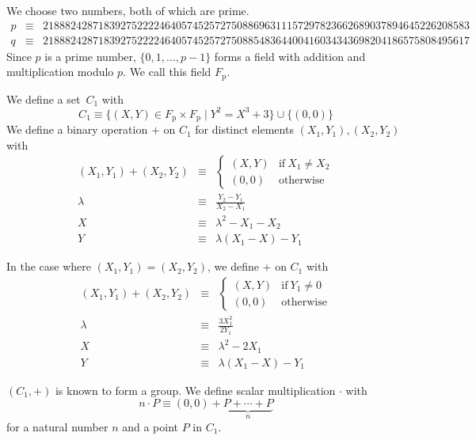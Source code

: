 \documentclass[9pt,oneside]{amsart}
\begin{document}
We choose two numbers, both of which are prime.
\begin{eqnarray}
p &\equiv& 21888242871839275222246405745257275088696311157297823662689037894645226208583 \\
q &\equiv& 21888242871839275222246405745257275088548364400416034343698204186575808495617
\end{eqnarray}
Since $p$ is a prime number, $\{0, 1, \ldots, p - 1\}$ forms a field with addition and multiplication modulo $p$. We call this field $F_{\mathrm{p}}$.

We define a set~$C_1$ with
\begin{equation}
C_1\equiv\{(X,Y)\in F_{\mathrm{p}}\times F_{\mathrm{p}}\mid Y^2=X^3+3\}\cup\{(0,0)\}
\end{equation}
We define a binary operation $+$ on $C_1$ for distinct elements $(X_1, Y_1), (X_2, Y_2)$ with
\begin{eqnarray}\label{eq:ec-addition}
(X_1, Y_1) + (X_2, Y_2)&\equiv&\begin{cases}
(X,Y)&\text{if}\ X_1\neq X_2\\
(0,0)&\text{otherwise}
\end{cases}\\
\nonumber \lambda&\equiv&\frac{Y_2-Y_1}{X_2-X_1}\\
\nonumber X&\equiv&\lambda^2-X_1-X_2\\
\nonumber Y&\equiv&\lambda(X_1-X)-Y_1
\end{eqnarray}

In the case where $(X_1, Y_1) = (X_2, Y_2)$, we define $+$ on $C_1$ with
\begin{eqnarray}\label{eq:ec-doubling}
(X_1, Y_1) + (X_2, Y_2)&\equiv&\begin{cases}
(X,Y)&\text{if}\ Y_1\neq 0\\
(0,0)&\text{otherwise}
\end{cases}\\
\nonumber \lambda&\equiv&\frac{3X_1^2}{2Y_1}\\
\nonumber X&\equiv&\lambda^2-2X_1\\
\nonumber Y&\equiv&\lambda(X_1-X)-Y_1
\end{eqnarray}

$(C_1,+)$ is known to form a group. We define scalar multiplication $\cdot$ with
\begin{equation}\label{eq:ec-scalar-multiplication}
n\cdot P\equiv(0,0)+\underbrace{P+\cdots+P}_{n}
\end{equation}
for a natural number $n$ and a point $P$ in $C_1$.
\end{document}
